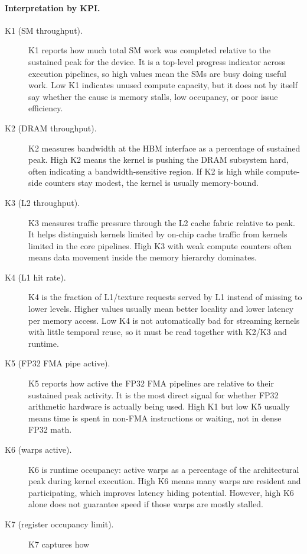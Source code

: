 \paragraph{Interpretation by KPI.}
\begin{description}
  \item[K1 (SM throughput).] K1 reports how much total SM work was
  completed relative to the sustained peak for the device. It is a top-level
  progress indicator across execution pipelines, so high values mean the SMs
  are busy doing useful work. Low K1 indicates unused compute capacity, but it
  does not by itself say whether the cause is memory stalls, low occupancy, or
  poor issue efficiency.
  \item[K2 (DRAM throughput).] K2 measures bandwidth at the HBM interface as
  a percentage of sustained peak. High K2 means the kernel is pushing the DRAM
  subsystem hard, often indicating a bandwidth-sensitive region. If K2 is high
  while compute-side counters stay modest, the kernel is usually memory-bound.
  \item[K3 (L2 throughput).] K3 measures traffic pressure through the L2
  cache fabric relative to peak. It helps distinguish kernels limited by
  on-chip cache traffic from kernels limited in the core pipelines. High K3
  with weak compute counters often means data movement inside the memory
  hierarchy dominates.
  \item[K4 (L1 hit rate).] K4 is the fraction of L1/texture requests served
  by L1 instead of missing to lower levels. Higher values usually mean better
  locality and lower latency per memory access. Low K4 is not automatically bad
  for streaming kernels with little temporal reuse, so it must be read together
  with K2/K3 and runtime.
  \item[K5 (FP32 FMA pipe active).] K5 reports how active the FP32 FMA
  pipelines are relative to their sustained peak activity. It is the most
  direct signal for whether FP32 arithmetic hardware is actually being used.
  High K1 but low K5 usually means time is spent in non-FMA instructions or
  waiting, not in dense FP32 math.
  \item[K6 (warps active).] K6 is runtime occupancy: active warps as a
  percentage of the architectural peak during kernel execution. High K6 means
  many warps are resident and participating, which improves latency hiding
  potential. However, high K6 alone does not guarantee speed if those warps are
  mostly stalled.
  \item[K7 (register occupancy limit).] K7 captures how

\end{description}
